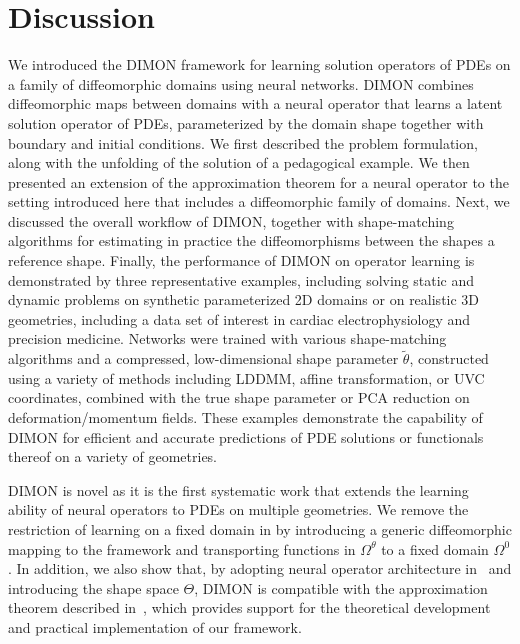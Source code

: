 \documentclass[review]{elsarticle}
\def\Omegatheta{{\Omega^\theta}}
\def\refd{0}
\def\Omegaref{{\Omega^\refd}}
\begin{document}
\section{Discussion}
\label{sec:disc}
We introduced the DIMON framework for learning solution operators of PDEs on a family of diffeomorphic domains using neural networks. DIMON combines diffeomorphic maps between domains with a neural operator that learns a latent solution operator of PDEs, parameterized by the domain shape together with boundary and initial conditions. We first described the problem formulation, along with the unfolding of the solution of a pedagogical example. We then presented an extension of the approximation theorem for a neural operator to the setting introduced here that includes a diffeomorphic family of domains. Next, we discussed the overall workflow of DIMON, together with shape-matching algorithms for estimating in practice the diffeomorphisms between the shapes a reference shape. Finally, the performance of DIMON on operator learning is demonstrated by three representative examples, including solving static and dynamic problems on synthetic parameterized 2D domains or on realistic 3D geometries, including a data set of interest in cardiac electrophysiology and precision medicine. Networks were trained with various shape-matching algorithms and a compressed, low-dimensional shape parameter $\tilde \theta$, constructed using a variety of methods including LDDMM, affine transformation, or UVC coordinates, combined with the true shape parameter or PCA reduction on deformation/momentum fields. These examples demonstrate the capability of DIMON for efficient and accurate predictions of PDE solutions or functionals thereof on a variety of geometries.

DIMON is novel as it is the first systematic work that extends the learning ability of neural operators to PDEs on multiple geometries. We remove the restriction of learning on a fixed domain in \cite{jin2022mionet,lu2021learning} by introducing a generic diffeomorphic mapping to the framework and transporting functions in $\Omegatheta$ to a fixed domain $\Omegaref$. In addition, we also show that, by adopting neural operator architecture in~\cite{jin2022mionet} and introducing the shape space $\Theta$, DIMON is compatible with the approximation theorem described in~\cite{jin2022mionet}, which provides support for the theoretical development and practical implementation of our framework. 
\end{document}

